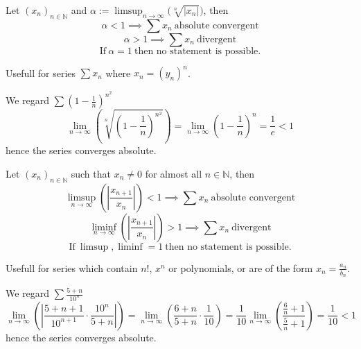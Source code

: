 \begin{proposition}\label{pro:root_test}
   Let \((x_n)_{n \in \mathbb{N}}\) and \(\alpha := \limsup_{n \to \infty}\big(\sqrt[n]{|x_n|}\big)\), then
   \[\alpha < 1 \implies \sum x_n~\text{absolute convergent}\]
   \[\alpha > 1 \implies \sum x_n~\text{divergent}\]
   \[\text{If}~\alpha = 1~\text{then no statement is possible.}\]
\end{proposition}
\begin{remark}[Tips]
   Usefull for series \(\sum x_n\) where \(x_n = (y_n)^n\).
\end{remark}
\begin{example}
   We regard \(\sum \left(1 - \frac{1}{n}\right)^{n^2}\)
   \[\lim_{n \to \infty}\left(\sqrt[n]{\left(1 - \frac{1}{n}\right)^{n^2}}\right) = \lim_{n \to \infty} \left(1 - \frac{1}{n}\right)^n = \frac{1}{e} < 1\]
   hence the series converges absolute.
\end{example}

\begin{proposition}\label{pro:ratio_test}
   Let \((x_n)_{n \in \mathbb{N}}\) such that \(x_n \neq 0\) for almost all \(n \in \mathbb{N}\), then
   \[\limsup_{n \to \infty} \left(\left|\frac{x_{n+1}}{x_n}\right|\right) < 1 \implies \sum x_n~\text{absolute convergent}\]
   \[\liminf_{n \to \infty} \left(\left|\frac{x_{n+1}}{x_n}\right|\right) > 1 \implies \sum x_n~\text{divergent}\]
   \[\text{If}~\limsup, \liminf = 1~\text{then no statement is possible.}\]
\end{proposition}
\begin{remark}[Tips]
   Usefull for series which contain \(n!\), \(x^n\) or polynomials, or are of the form \(x_n = \frac{a_n}{b_n}\).
\end{remark}
\begin{example}
   We regard \(\sum \frac{5 + n}{10^n}\)
   \[\lim_{n \to \infty}\left(\left\lvert\frac{5 + n + 1}{10^{n+1}} \cdot \frac{10^n}{5 + n}\right\rvert\right) = \lim_{n \to \infty}\left(\frac{6+n}{5+n} \cdot \frac{1}{10}\right) = \frac{1}{10} \lim_{n \to \infty}\left(\frac{\frac{6}{n} + 1}{\frac{5}{n}+1}\right) = \frac{1}{10} < 1\]
   hence the series converges absolute.
\end{example}

